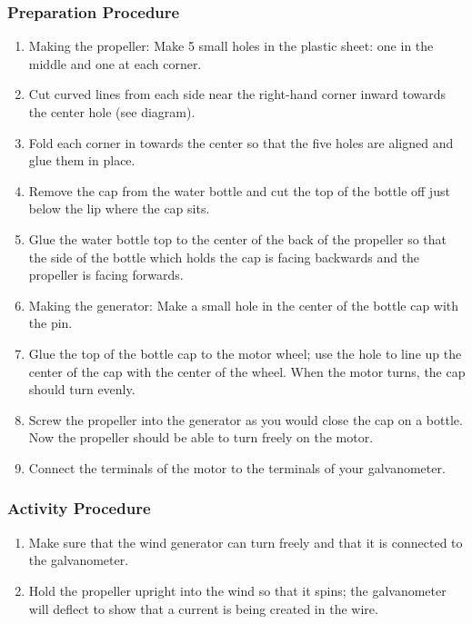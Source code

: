 \subsubsection*{Preparation Procedure}
\begin{enumerate}
\item{Making the propeller: Make 5 small holes in the plastic sheet: one in the middle and one at each corner.} 
\item{Cut curved lines from each side near the right-hand corner inward towards the center hole (see diagram).} 
\item{Fold each corner in towards the center so that the five holes are aligned and glue them in place.} 
\item{Remove the cap from the water bottle and cut the top of the bottle off just below the lip where the cap sits.} 
\item{Glue the water bottle top to the center of the back of the propeller so that the side of the bottle which holds the cap is facing backwards and the propeller is facing forwards.} 
\item{Making the generator: Make a small hole in the center of the bottle cap with the pin.} 
\item{Glue the top of the bottle cap to the motor wheel; use the hole to line up the center of the cap with the center of the wheel. When the motor turns, the cap should turn evenly.} 
\item{Screw the propeller into the generator as you would close the cap on a bottle. Now the propeller should be able to turn freely on the motor.} 
\item{Connect the terminals of the motor to the terminals of your galvanometer.} 
\end{enumerate}

\subsubsection*{Activity Procedure}
\begin{enumerate}
\item{Make sure that the wind generator can turn freely and that it is connected to the galvanometer.} 
\item{Hold the propeller upright into the wind so that it spins; the galvanometer will deflect to show that a current is being created in the wire.} 
\end{enumerate}

